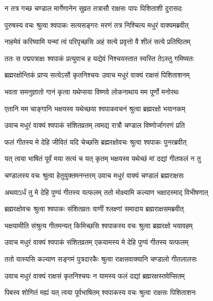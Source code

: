 \twolineshloka
{न तत्र गच्छ चण्डाल मार्गेणानेन सुव्रत}
{तत्रासौ राक्षसः पापः पिशिताशी दुरासदः}%

\twolineshloka
{पुरुषस्य वचः श्रुत्वा श्वपाकः सत्यसङ्गरः}
{मरणं तत्र निश्चित्य मधुरं वाक्यमब्रवीत्}%

\twolineshloka
{नाहमेवं करिष्यामि यन्मां त्वं परिपृच्छसि}
{अहं सत्ये प्रवृत्तो वै शीलं सत्ये प्रतिष्ठितम्}%

\twolineshloka
{ततः स पद्मपत्राक्षः श्वपाकं प्रत्युवाच ह}
{यद्येवं निश्चयस्तात स्वस्ति तेऽस्तु गमिष्यतः}%

\twolineshloka
{ब्रह्मरक्षोन्तिकं प्राप्य सत्येऽसौ कृतनिश्चयः}
{उवाच मधुरं वाक्यं राक्षसं पिशिताशनम्}%

\twolineshloka
{भवता समनुज्ञातो गानं कृत्वा यथेप्सया}
{विष्णवे लोकनाथाय मम पूर्णो मनोरथः}%

\twolineshloka
{एतानि मम चाङ्गानि भक्षयस्व यथेच्छया}
{श्वपाकवचनं श्रुत्वा ब्रह्मरक्षो भयानकम्}%

\twolineshloka
{उवाच मधुरं वाक्यं श्वपाकं संशितव्रतम्}
{त्वमद्य रात्रौ चण्डाल विष्णोर्जागरणं प्रति}%

\twolineshloka
{फलं गीतस्य मे देहि जीवितं यदि चेच्छसि}
{ब्रह्मरक्षोवचः श्रुत्वा श्वपाकः पुनरब्रवीत्}%

\twolineshloka
{यत् त्वया भाषितं पूर्वं मया सत्यं च यत् कृतम्}
{भक्षयस्व यथेच्छं मां दद्यां गीतफलं न तु}%

\twolineshloka
{चण्डालस्य वचः श्रुत्वा हेतुयुक्तमनन्तरम्}
{उवाच मधुरं वाक्यं चण्डालं ब्रह्मराक्षसः}%

\twolineshloka
{अथवाऽर्धं तु मे देहि पुण्यं गीतस्य यत्फलम्}
{ततो मोक्ष्यामि कल्याण भक्षादस्माद् विभीषणात्}%

\twolineshloka
{ब्रह्मरक्षोवचः श्रुत्वा श्वपाकः संशितव्रतः}
{वाणीं श्लक्ष्णां समादाय ब्रह्मराक्षसमब्रवीत्}%

\twolineshloka
{भक्षयामीति संश्रुत्य गीतमन्यत् किमिच्छसि}
{श्वपाकस्य वचः श्रुत्वा ब्रह्मरक्षो भयावहम्}%

\twolineshloka
{उवाच मधुरं वाक्यं श्वपाकं संशितव्रतम्}
{एकयामस्य मे देहि पुण्यं गीतस्य यत्फलम्}%

\twolineshloka
{ततो यास्यसि कल्याण सङ्गमं पुत्रदारकैः}
{श्रुत्वा राक्षसवाक्यानि चण्डालो गीतलालसः}%

\twolineshloka
{उवाच मधुरं वाक्यं राक्षसं कृतनिश्चयः}
{न यामस्य फलं दद्यां ब्रह्मरक्षस्तवेप्सितम्}%

\twolineshloka
{पिबस्व शोणितं मह्यं यत् त्वया पूर्वभाषितम्}
{श्वपाकस्य वचः श्रुत्वा राक्षसः पिशिताशनः}%


